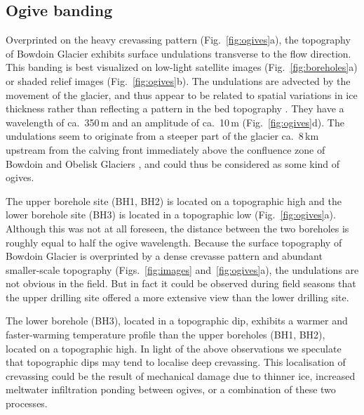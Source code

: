 \documentclass[utf8]{article}
\begin{document}
\subsection{Ogive banding}

    Overprinted on the heavy crevassing pattern (Fig.~\ref{fig:ogives}a), the
    topography of Bowdoin Glacier exhibits surface undulations transverse to
    the flow direction. This banding is best visualized on low-light satellite
    images (Fig.~\ref{fig:boreholes}a) or shaded relief images
    (Fig.~\ref{fig:ogives}b). The undulations are advected by the movement of
    the glacier, and thus appear to be related to spatial variations in
    ice thickness rather than reflecting a pattern in the bed topography
    \citep[Fig.~\ref{fig:ogives}c;][Fig.~3]{Tsutaki.etal.2016}. They have a
    wavelength of ca.~350\,m and an amplitude of ca.~10\,m
    (Fig.~\ref{fig:ogives}d). The undulations seem to originate from a
    steeper part of the glacier ca.~8\,km upstream from the calving front
    immediately above the confluence zone of Bowdoin and Obelisk Glaciers
    \citep[Fig.~\ref{fig:images}a;][Fig.~3]{Tsutaki.etal.2016}, and
    could thus be considered as some kind of ogives.

    The upper borehole site (BH1, BH2) is located on a topographic high and the
    lower borehole site (BH3) is located in a topographic low
    (Fig.~\ref{fig:ogives}a). Although this
    was not at all foreseen, the distance between the two boreholes is roughly
    equal to half the ogive wavelength. Because the surface topography of
    Bowdoin Glacier is overprinted by a dense crevasse pattern and abundant
    smaller-scale topography (Figs.~\ref{fig:images} and~\ref{fig:ogives}a),
    the undulations are not obvious in the field. But in fact it
    could be observed during field seasons that the upper drilling site offered
    a more extensive view than the lower drilling site.

    The lower borehole (BH3), located in a topographic dip, exhibits a warmer
    and faster-warming temperature profile than the upper boreholes (BH1, BH2),
    located on a topographic high. In light of the above observations we
    speculate that topographic dips may tend to localise deep
    crevassing. This localisation of crevassing
    could be the result of mechanical damage due to thinner ice, increased
    meltwater infiltration ponding between ogives, or a combination of these
    two processes.
\end{document}
